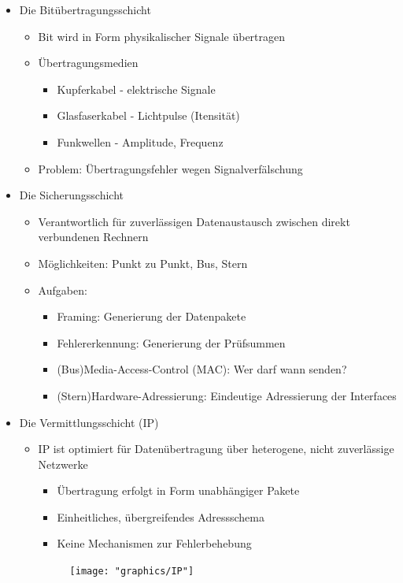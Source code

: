 \documentclass{scrreprt}
\begin{document}
\begin{itemize}
	\item Die Bitübertragungsschicht
	\begin{itemize}
		\item Bit wird in Form physikalischer Signale übertragen
		\item Übertragungsmedien
		\begin{itemize}
			\item Kupferkabel - elektrische Signale
			\item Glasfaserkabel - Lichtpulse (Itensität)
			\item Funkwellen - Amplitude, Frequenz
		\end{itemize}
		\item Problem: Übertragungsfehler wegen Signalverfälschung
	\end{itemize}
	\item Die Sicherungsschicht
	\begin{itemize}
		\item Verantwortlich für zuverlässigen Datenaustausch zwischen direkt verbundenen Rechnern
		\item Möglichkeiten: Punkt zu Punkt, Bus, Stern
		\item Aufgaben:
		\begin{itemize}
			\item Framing: Generierung der Datenpakete
			\item Fehlererkennung: Generierung der Prüfsummen
			\item (Bus)Media-Access-Control (MAC): Wer darf wann senden?
			\item (Stern)Hardware-Adressierung: Eindeutige Adressierung der Interfaces
		\end{itemize}
	\end{itemize}
	\item Die Vermittlungsschicht (IP)
	\begin{itemize}
		\item IP ist optimiert für Datenübertragung über heterogene, nicht zuverlässige Netzwerke
		\begin{itemize}
			\item Übertragung erfolgt in Form unabhängiger Pakete
			\item Einheitliches, übergreifendes Adressschema
			\item Keine Mechanismen zur Fehlerbehebung
		\end{itemize}
		\begin{figure}[h]
			\texttt{[image: "graphics/IP"]}

\end{figure}
\end{itemize}
\end{itemize}
\end{document}

